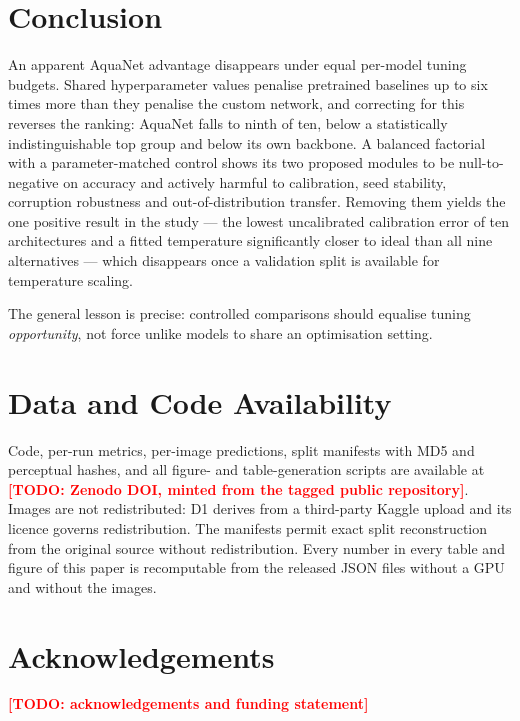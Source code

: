 \documentclass[10pt,journal]{IEEEtran}
\newcommand{\todo}[1]{\textcolor{red}{\textbf{[TODO: #1]}}}
\begin{document}
\section{Conclusion}
An apparent AquaNet advantage disappears under equal per-model tuning budgets. Shared
hyperparameter values penalise pretrained baselines up to six times more than they penalise
the custom network, and correcting for this reverses the ranking: AquaNet falls to ninth of
ten, below a statistically indistinguishable top group and below its own backbone. A balanced
factorial with a parameter-matched control shows its two proposed modules to be
null-to-negative on accuracy and actively harmful to calibration, seed stability, corruption
robustness and out-of-distribution transfer. Removing them yields the one positive result in
the study --- the lowest uncalibrated calibration error of ten architectures and a fitted
temperature significantly closer to ideal than all nine alternatives --- which disappears
once a validation split is available for temperature scaling.

The general lesson is precise: controlled comparisons should equalise tuning
\emph{opportunity}, not force unlike models to share an optimisation setting.

\section*{Data and Code Availability}
Code, per-run metrics, per-image predictions, split manifests with MD5 and perceptual hashes,
and all figure- and table-generation scripts are available at \todo{Zenodo DOI, minted from
the tagged public repository}. Images are not redistributed: D1 derives from a third-party
Kaggle upload and its licence governs redistribution. The manifests permit exact split
reconstruction from the original source without redistribution. Every number in every table
and figure of this paper is recomputable from the released JSON files without a GPU and
without the images.

\section*{Acknowledgements}
\todo{acknowledgements and funding statement}



\end{document}
